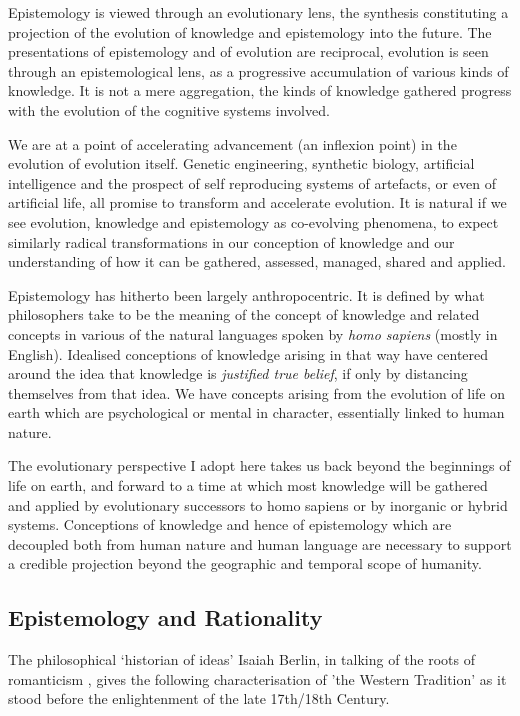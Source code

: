 \documentclass[10pt,titlepage]{book}
\begin{document}
Epistemology is viewed through an evolutionary lens, the synthesis constituting a projection of the evolution of knowledge and epistemology into the future.
The presentations of epistemology and of evolution are reciprocal,
evolution is seen through an epistemological lens, as a progressive accumulation of various kinds of knowledge.
It is not a mere aggregation, the kinds of knowledge gathered progress with the evolution of the cognitive systems involved.

 We are at a point of accelerating advancement (an inflexion point) in the evolution of evolution itself.
Genetic engineering, synthetic biology, artificial intelligence and the prospect of self reproducing systems of artefacts, or even of artificial life, all promise to transform and accelerate evolution.
It is natural if we see evolution, knowledge and epistemology as co-evolving phenomena, to expect similarly radical transformations in our conception of knowledge and our understanding of how it can be gathered, assessed, managed, shared and applied.

Epistemology has hitherto been largely anthropocentric.
It is defined by what philosophers take to be the meaning of the concept of knowledge and related concepts in various of the natural languages spoken by \emph{homo sapiens} (mostly in English).
Idealised conceptions of knowledge arising in that way have centered around the idea that knowledge is \emph{justified true belief}, if only by distancing themselves from that idea.
We have concepts arising from the evolution of life on earth which are psychological or mental in character, essentially linked to human nature.

The evolutionary perspective I adopt here takes us back beyond the beginnings of life on earth, and forward to a time at which most knowledge will be gathered and applied by evolutionary successors to homo sapiens or by inorganic or hybrid systems.
Conceptions of knowledge and hence of epistemology which are decoupled both from human nature and human language are necessary to support a credible projection beyond the geographic and temporal scope of humanity.

\subsection{Epistemology and Rationality}

The philosophical `historian of ideas' Isaiah Berlin, in talking of the roots of romanticism \cite{berlinRR}, gives the following characterisation of 'the Western Tradition' as it stood before the enlightenment of the late 17th/18th Century.
\end{document}
